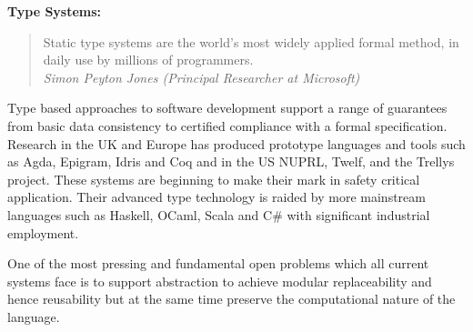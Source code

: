 \documentclass[a4paper,11pt]{article}
\begin{document}
{\bf Type Systems:} 
\begin{quote}
  Static type systems are the world's most widely applied formal
  method, in daily use by millions of programmers.\\
  \emph{Simon Peyton Jones (Principal Researcher at
    Microsoft)}
\end{quote}
Type based approaches to software development support a range of
guarantees from basic data consistency to certified compliance with a
formal specification. Research in the UK and Europe has produced 
prototype languages and tools such as Agda, Epigram, Idris and Coq
and in the US NUPRL, Twelf,  and the Trellys project. These systems are
beginning to make their mark in safety critical application. Their
advanced type technology is raided by more mainstream languages 
such as Haskell, OCaml, Scala and C\# with significant industrial
employment. 


One of the most pressing and fundamental
open problems which all current systems face is to support abstraction
to achieve modular replaceability and hence reusability
but at the same time preserve the computational nature of the language.


\end{document}
